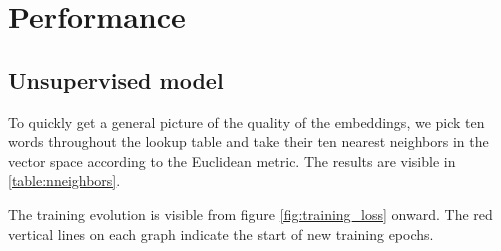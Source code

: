 \section{Performance}
\label{sec:performance}
\subsection{Unsupervised model}
\label{sec:unsupacc}
To quickly get a general picture of the quality of the embeddings, we
pick ten words throughout the lookup table and take their ten nearest
neighbors in the vector space according to the Euclidean metric. The
results are visible in \ref{table:nneighbors}.

The training evolution is visible from figure \ref{fig:training_loss}
onward. The red vertical lines on each graph indicate the start of new training epochs.


